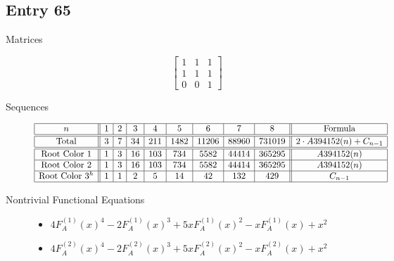 \documentclass[12pt]{amsart}
\newcommand{\gff}[2]{F_{#2}^{(#1)}(x)}
\newcommand{\gfa}[1]{\gff{#1}{A}}
\begin{document}
\subsection*{Entry 65}
\begin{description}
    \item[Matrices]
    
    \[\begin{bmatrix}
1 & 1 & 1 \\
1 & 1 & 1 \\
0 & 0 & 1
\end{bmatrix}\]
    \item[Sequences]\hspace*{\fill}\vspace{-0.5cm}
    \begin{center}
        \[
        \begin{array}{|c||c|c|c|c|c|c|c|c||c|}\hline
           n  & 1 & 2 & 3 & 4 & 5 & 6 & 7 & 8  & \text{Formula}\\\hline\hline
           \text{Total}  & 3 & 7 & 34 & 211 & 1482 & 11206 & 88960 & 731019 & 2\cdot A394152(n)+C_{n-1}\\\hline\hline
           \text{Root Color }1 & 1 & 3 & 16 & 103 & 734 & 5582 & 44414 & 365295 & A394152(n) \\\hline
           \text{Root Color }2 & 1 & 3 & 16 & 103 & 734 & 5582 & 44414 & 365295 & A394152(n) \\\hline
           \text{Root Color }3^{h} & 1 & 1 & 2 & 5 & 14 & 42 & 132 & 429 & C_{n-1}\\\hline
        \end{array}
        \]
    \end{center}
    
    \item[Nontrivial Functional Equations]\hspace*{\fill}

    \begin{itemize}
\item $4\gfa{1}^4-2\gfa{1}^3+5x\gfa{1}^2-x\gfa{1}+x^2$


\item $4\gfa{2}^4-2\gfa{2}^3+5x\gfa{2}^2-x\gfa{2}+x^2$


\end{itemize}
    
\end{description}
\end{document}
